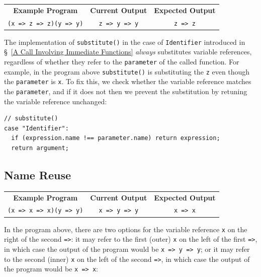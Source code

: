 \documentclass[12pt, oneside]{book}
\begin{document}
\begin{center}
\begin{tabular}{c|c|c}
\textbf{Example Program} & \textbf{Current Output} & \textbf{Expected Output} \\
\texttt{(x => z => z)(y => y)} & \texttt{z => y => y} & \texttt{z => z} \\
\end{tabular}
\end{center}

The implementation of \texttt{substitute()} in the case of \texttt{Identifier} introduced in §~\ref{A Call Involving Immediate Functions} \emph{always} substitutes variable references, regardless of whether they refer to the \texttt{parameter} of the called function. For example, in the program above \texttt{substitute()} is substituting the \texttt{z} even though the \texttt{parameter} is \texttt{x}. To fix this, we check whether the variable reference matches the \texttt{parameter}, and if it does not then we prevent the substitution by retuning the variable reference unchanged:

\begin{verbatim}
// substitute()
case "Identifier":
  if (expression.name !== parameter.name) return expression;
  return argument;
\end{verbatim}

\subsection{Name Reuse}

\begin{center}
\begin{tabular}{c|c|c}
\textbf{Example Program} & \textbf{Current Output} & \textbf{Expected Output} \\
\texttt{(x => x => x)(y => y)} & \texttt{x => y => y} & \texttt{x => x} \\
\end{tabular}
\end{center}

In the program above, there are two options for the variable reference \texttt{x} on the right of the second \texttt{=>}: it may refer to the first (outer) \texttt{x} on the left of the first \texttt{=>}, in which case the output of the program would be \texttt{x => y => y}; or it may refer to the second (inner) \texttt{x} on the left of the second \texttt{=>}, in which case the output of the program would be \texttt{x => x}:
\end{document}
